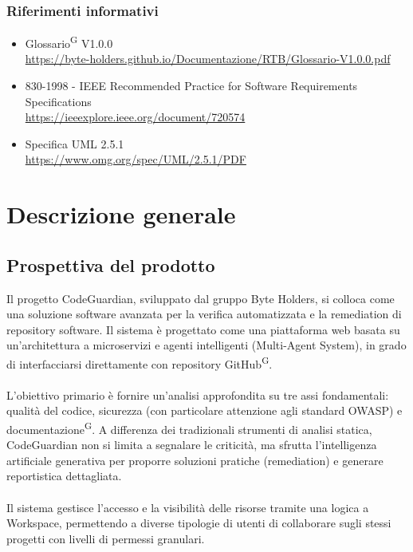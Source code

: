 \documentclass[a4paper, 11pt]{article}
\newcommand{\refterm}[1]{#1\textsuperscript{G}}
\begin{document}
\subsubsection{Riferimenti informativi}
\begin{itemize}
	\item
		\refterm{Glossario} V1.0.0\\
		\url{https://byte-holders.github.io/Documentazione/RTB/Glossario-V1.0.0.pdf}
	\item
		830-1998 - IEEE Recommended Practice for Software Requirements Specifications\\
		\url{https://ieeexplore.ieee.org/document/720574}
	\item
		Specifica UML 2.5.1\\
		\url{https://www.omg.org/spec/UML/2.5.1/PDF}
\end{itemize}

\section{Descrizione generale} \label{sec:descrizione generale}
\subsection{Prospettiva del prodotto}
Il progetto CodeGuardian, sviluppato dal gruppo Byte Holders, si colloca come una soluzione software avanzata per la verifica automatizzata e la remediation di repository software. Il sistema è progettato come una piattaforma web basata su un'architettura a microservizi e agenti intelligenti (Multi-Agent System), in grado di interfacciarsi direttamente con repository GitHub\textsuperscript{G}.
\\ \\
L'obiettivo primario è fornire un'analisi approfondita su tre assi fondamentali: qualità del codice, sicurezza (con particolare attenzione agli standard OWASP) e documentazione\textsuperscript{G}. A differenza dei tradizionali strumenti di analisi statica, CodeGuardian non si limita a segnalare le criticità, ma sfrutta l'intelligenza artificiale generativa per proporre soluzioni pratiche (remediation) e generare reportistica dettagliata.
\\ \\
Il sistema gestisce l'accesso e la visibilità delle risorse tramite una logica a Workspace, permettendo a diverse tipologie di utenti di collaborare sugli stessi progetti con livelli di permessi granulari.
\end{document}
